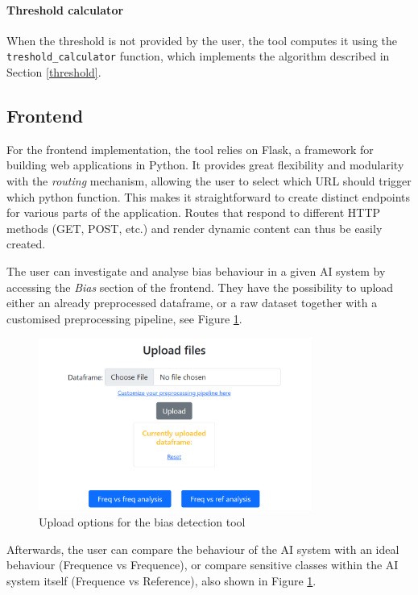 \documentclass[
]{ceurart}
\begin{document}
\paragraph{Threshold calculator}
When the threshold is not provided by the user, the tool computes it using the \texttt{treshold\_calculator} function, which implements the algorithm described in Section \ref{threshold}.

\subsection{Frontend}

For the frontend implementation, the tool relies on Flask, a  framework for building web applications in Python. It provides great flexibility and modularity with the \textit{routing} mechanism, allowing the user to select which URL should trigger which python function. This makes it straightforward to create distinct endpoints for various parts of the application. Routes that respond to different HTTP methods (GET, POST, etc.) and render dynamic content can thus be easily created.

The user can investigate and analyse bias behaviour in a given AI system by accessing the \textit{Bias} section of the frontend. They have the possibility to upload either an already preprocessed dataframe, or a raw dataset together with a customised preprocessing pipeline, see Figure \ref{fig:bias_upload}.

\begin{figure}[h]
  \begin{center}
    \includegraphics[width=0.8\textwidth]{frontend_bias_upload.png}
  \end{center}
  \caption{Upload options for the bias detection tool}
  \label{fig:bias_upload}
\end{figure}


Afterwards, the user can compare the behaviour of the AI system with an ideal behaviour (Frequence vs Frequence), or compare sensitive classes within the AI system itself (Frequence vs Reference), also shown in Figure \ref{fig:bias_upload}.
\end{document}
